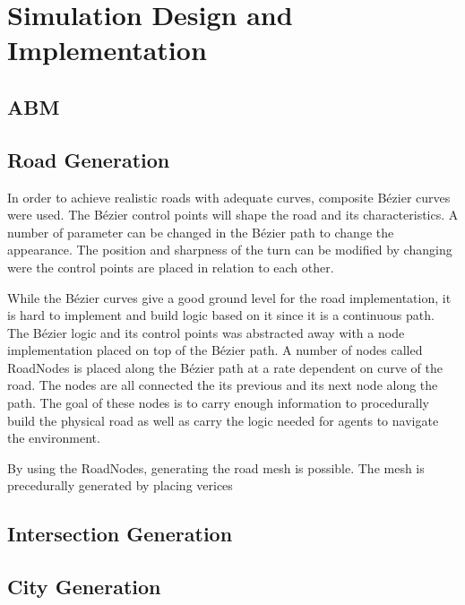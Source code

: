\section{Simulation Design and Implementation}

\subsection{ABM}

\subsection{Road Generation}
In order to achieve realistic roads with adequate curves, composite Bézier curves were used. The Bézier control points will shape the road and its characteristics. A number of parameter can be changed in the Bézier path to change the appearance. The position and sharpness of the turn can be modified by changing were the control points are placed in relation to each other. 

While the Bézier curves give a good ground level for the road implementation, it is hard to implement and build logic based on it since it is a continuous path. The Bézier logic and its control points was abstracted away with a node implementation placed on top of the Bézier path. A number of nodes called RoadNodes is placed along the Bézier path at a rate dependent on curve of the road. The nodes are all connected the its previous and its next node along the path. The goal of these nodes is to carry enough information to procedurally  build the physical road as well as carry the logic needed for agents to navigate the environment.

By using the RoadNodes, generating the road mesh is possible. The mesh is precedurally generated by placing verices 
        
\subsection{Intersection Generation}

\subsection{City Generation}

